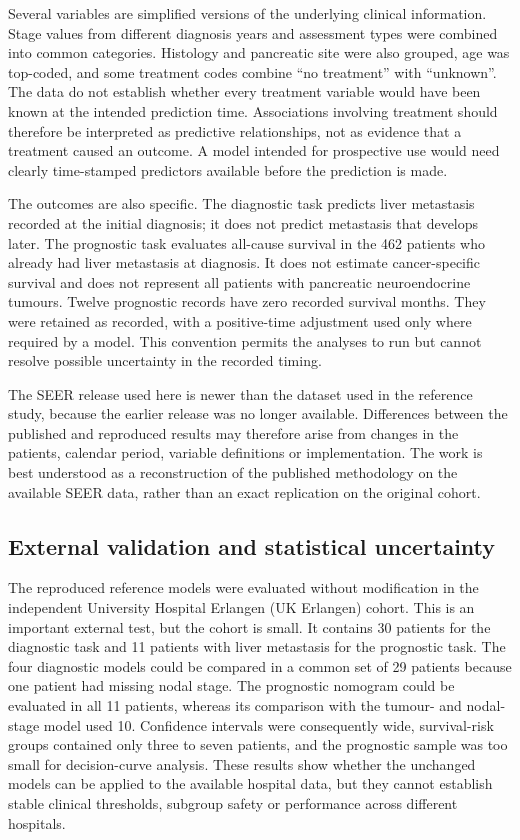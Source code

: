 Several variables are simplified versions of the underlying clinical
information. Stage values from different diagnosis years and assessment types
were combined into common categories. Histology and pancreatic site were also
grouped, age was top-coded, and some treatment codes combine ``no treatment''
with ``unknown''. The data do not establish whether every treatment variable
would have been known at the intended prediction time. Associations involving
treatment should therefore be interpreted as predictive relationships, not as
evidence that a treatment caused an outcome. A model intended for prospective
use would need clearly time-stamped predictors available before the prediction
is made.

The outcomes are also specific. The diagnostic task predicts liver metastasis
recorded at the initial diagnosis; it does not predict metastasis that develops
later. The prognostic task evaluates all-cause survival in the 462 patients who
already had liver metastasis at diagnosis. It does not estimate cancer-specific
survival and does not represent all patients with pancreatic neuroendocrine
tumours. Twelve prognostic records have zero recorded survival months. They were
retained as recorded, with a positive-time adjustment used only where required
by a model. This convention permits the analyses to run but cannot resolve
possible uncertainty in the recorded timing.

The SEER release used here is newer than the dataset used in the reference
study, because the earlier release was no longer available. Differences between
the published and reproduced results may therefore arise from changes in the
patients, calendar period, variable definitions or implementation. The work is
best understood as a reconstruction of the published methodology on the
available SEER data, rather than an exact replication on the original cohort.

\subsection{External validation and statistical uncertainty}

The reproduced reference models were evaluated without modification in the
independent University Hospital Erlangen (UK Erlangen) cohort. This is an
important external test, but the cohort is small. It contains 30 patients for
the diagnostic task and 11 patients with liver metastasis for the prognostic
task. The four diagnostic models could be compared in a common set of 29
patients because one patient had missing nodal stage. The prognostic nomogram
could be evaluated in all 11 patients, whereas its comparison with the tumour-
and nodal-stage model used 10. Confidence intervals were consequently wide,
survival-risk groups contained only three to seven patients, and the prognostic
sample was too small for decision-curve analysis. These results show whether the
unchanged models can be applied to the available hospital data, but they cannot
establish stable clinical thresholds, subgroup safety or performance across
different hospitals.

